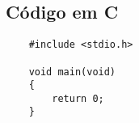 \begin{apendicesenv}
\partapendices
\chapter{Código em C}
  \begin{lstlisting}
    #include <stdio.h>

    void main(void)
    {
    	return 0;
    }
  \end{lstlisting}
\end{apendicesenv}